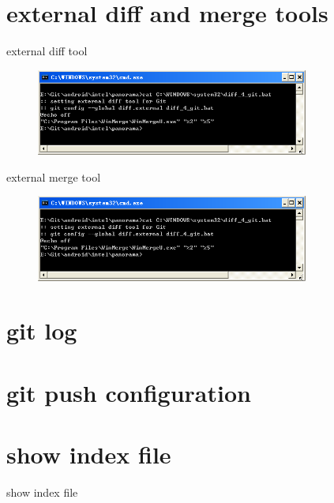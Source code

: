 ﻿\documentclass{beamer}
\begin{document}
\section[external diff and merge tools]{external diff and merge tools}
\begin{frame}{external diff tool}
\begin{figure}
  \centering
  \includegraphics[width=0.8\textwidth]{diff.png}%
\end{figure}
\end{frame}

\begin{frame}{external merge tool}
\begin{figure}
  \centering
  \includegraphics[width=0.8\textwidth]{diff.png}%
\end{figure}
\end{frame}

\section[git log]{git log}
\begin{frame}{}
\end{frame}

\section[git push configuration]{git push configuration}
\begin{frame}{}
\end{frame}

\section[show index file]{show index file}
\begin{frame}{show index file}
\end{frame}
\end{document}
